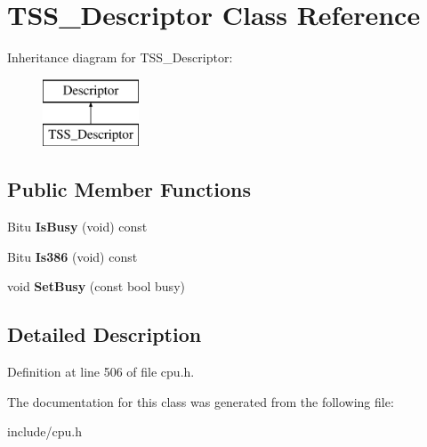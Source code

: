 \hypertarget{classTSS__Descriptor}{\section{T\-S\-S\-\_\-\-Descriptor Class Reference}
\label{classTSS__Descriptor}
}
Inheritance diagram for T\-S\-S\-\_\-\-Descriptor\-:\begin{figure}[H]
\begin{center}
\leavevmode
\includegraphics[height=2.000000cm]{classTSS__Descriptor}
\end{center}
\end{figure}
\subsection*{Public Member Functions}
\begin{DoxyCompactItemize}
\item 
\hypertarget{classTSS__Descriptor_a26dd9532a72d55eb59015058c4ee7dc2}{Bitu {\bfseries Is\-Busy} (void) const }\label{classTSS__Descriptor_a26dd9532a72d55eb59015058c4ee7dc2}

\item 
\hypertarget{classTSS__Descriptor_a3b41b696577f19ee21c4130256158ec9}{Bitu {\bfseries Is386} (void) const }\label{classTSS__Descriptor_a3b41b696577f19ee21c4130256158ec9}

\item 
\hypertarget{classTSS__Descriptor_a1fd4b23896821543c3bd7ba8ef17669f}{void {\bfseries Set\-Busy} (const bool busy)}\label{classTSS__Descriptor_a1fd4b23896821543c3bd7ba8ef17669f}

\end{DoxyCompactItemize}


\subsection{Detailed Description}


Definition at line 506 of file cpu.\-h.



The documentation for this class was generated from the following file\-:\begin{DoxyCompactItemize}
\item 
include/cpu.\-h\end{DoxyCompactItemize}
